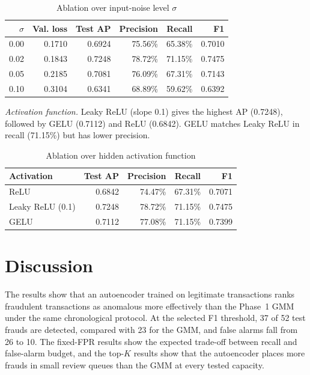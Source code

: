 \documentclass[conference]{IEEEtran}
\begin{document}
\begin{table}[t]
\caption{Ablation over input-noise level $\sigma$}
\label{tab:abl_sigma}
\centering
\small
\begin{tabular}{rrrrrr}
\toprule
$\sigma$ & Val. loss & Test AP & Precision & Recall & F1\\
\midrule
0.00 & 0.1710 & 0.6924 & 75.56\% & 65.38\% & 0.7010\\
0.02 & 0.1843 & 0.7248 & 78.72\% & 71.15\% & 0.7475\\
0.05 & 0.2185 & 0.7081 & 76.09\% & 67.31\% & 0.7143\\
0.10 & 0.3104 & 0.6341 & 68.89\% & 59.62\% & 0.6392\\
\bottomrule
\end{tabular}
\end{table}

\textit{Activation function.} Leaky ReLU (slope 0.1) gives the highest AP (0.7248), followed by GELU (0.7112) and ReLU (0.6842). GELU matches Leaky ReLU in recall (71.15\%) but has lower precision.

\begin{table}[t]
\caption{Ablation over hidden activation function}
\label{tab:abl_act}
\centering
\small
\begin{tabular}{lrrrr}
\toprule
Activation & Test AP & Precision & Recall & F1\\
\midrule
ReLU & 0.6842 & 74.47\% & 67.31\% & 0.7071\\
Leaky ReLU (0.1) & 0.7248 & 78.72\% & 71.15\% & 0.7475\\
GELU & 0.7112 & 77.08\% & 71.15\% & 0.7399\\
\bottomrule
\end{tabular}
\end{table}

\section{Discussion}
The results show that an autoencoder trained on legitimate transactions ranks fraudulent transactions as anomalous more effectively than the Phase~1 GMM under the same chronological protocol. At the selected F1 threshold, 37 of 52 test frauds are detected, compared with 23 for the GMM, and false alarms fall from 26 to 10. The fixed-FPR results show the expected trade-off between recall and false-alarm budget, and the top-$K$ results show that the autoencoder places more frauds in small review queues than the GMM at every tested capacity.
\end{document}
